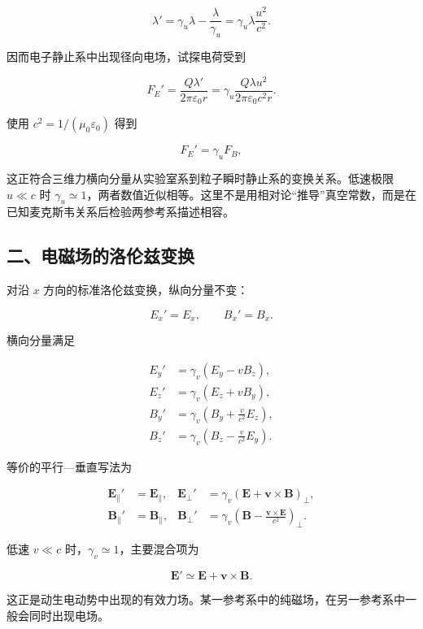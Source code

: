 \[
\boxed{
\lambda'
=\gamma_u\lambda-\frac{\lambda}{\gamma_u}
=\gamma_u\lambda\frac{u^2}{c^2}}.
\]

因而电子静止系中出现径向电场，试探电荷受到

\[
F_E'
=\frac{Q\lambda'}{2\pi\varepsilon_0r}
=\gamma_u\frac{Q\lambda u^2}{2\pi\varepsilon_0c^2r}.
\]

使用 \(c^2=1/(\mu_0\varepsilon_0)\) 得到

\[
\boxed{F_E'=\gamma_u F_B},
\]

这正符合三维力横向分量从实验室系到粒子瞬时静止系的变换关系。低速极限
\(u\ll c\) 时
\(\gamma_u\simeq1\)，两者数值近似相等。这里不是用相对论``推导''真空常数，而是在已知麦克斯韦关系后检验两参考系描述相容。

\subsection{二、电磁场的洛伦兹变换}\label{m7:ux4e8cux7535ux78c1ux573aux7684ux6d1bux4f26ux5179ux53d8ux6362}

对沿 \(x\) 方向的标准洛伦兹变换，纵向分量不变：

\[
E_x'=E_x,
\qquad
B_x'=B_x.
\]

横向分量满足

\[
\boxed{
\begin{aligned}
E_y'&=\gamma_v(E_y-vB_z),\\
E_z'&=\gamma_v(E_z+vB_y),\\
B_y'&=\gamma_v\left(B_y+\frac{v}{c^2}E_z\right),\\
B_z'&=\gamma_v\left(B_z-\frac{v}{c^2}E_y\right).
\end{aligned}}
\]

等价的平行---垂直写法为

\[
\begin{aligned}
\mathbf E_{\parallel}'&=\mathbf E_{\parallel},
&\mathbf E_{\perp}'&=\gamma_v(\mathbf E+\mathbf v\times\mathbf B)_{\perp},\\
\mathbf B_{\parallel}'&=\mathbf B_{\parallel},
&\mathbf B_{\perp}'&=\gamma_v\left(\mathbf B-\frac{\mathbf v\times\mathbf E}{c^2}\right)_{\perp}.
\end{aligned}
\]

低速 \(v\ll c\) 时，\(\gamma_v\simeq1\)，主要混合项为

\[
\boxed{
\mathbf E'\simeq\mathbf E+\mathbf v\times\mathbf B}.
\]

这正是动生电动势中出现的有效力场。某一参考系中的纯磁场，在另一参考系中一般会同时出现电场。

